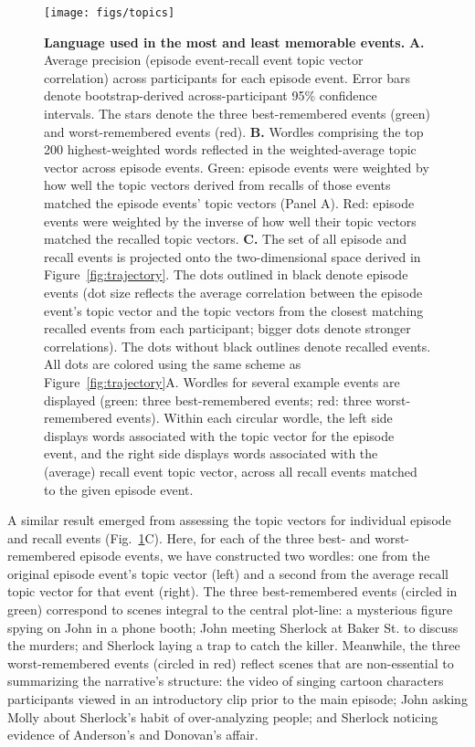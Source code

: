 \documentclass{article}
\begin{document}
\begin{figure}[tp]
\centering
\texttt{[image: figs/topics]}
\caption{\small \textbf{Language used in the most and least memorable events.} \textbf{A.} Average precision (episode event-recall event topic vector correlation) across participants for each episode event.  Error bars denote bootstrap-derived across-participant 95\% confidence intervals.  The stars denote the three best-remembered events (green) and worst-remembered events (red).  \textbf{B.} Wordles comprising the top 200 highest-weighted words reflected in the weighted-average topic vector across episode events.  Green: episode events were weighted by how well the topic vectors derived from recalls of those events matched the episode events' topic vectors (Panel A).  Red: episode events were weighted by the inverse of how well their topic vectors matched the recalled topic vectors.  \textbf{C.}  The set of all episode and recall events is projected onto the two-dimensional space derived in Figure~\ref{fig:trajectory}.  The dots outlined in black denote episode events (dot size reflects the average correlation between the episode event's topic vector and the topic vectors from the closest matching recalled events from each participant; bigger dots denote stronger correlations).  The dots without black outlines denote recalled events.  All dots are colored using the same scheme as Figure~\ref{fig:trajectory}A.  Wordles for several example events are displayed (green: three best-remembered events; red: three worst-remembered events).  Within each circular wordle, the left side displays words associated with the topic vector for the episode event, and the right side displays words associated with the (average) recall event topic vector, across all recall events matched to the given episode event.}
\label{fig:topics}
\end{figure}

A similar result emerged from assessing the topic vectors for individual episode and recall events (Fig.~\ref{fig:topics}C).  Here, for each of the three best- and worst-remembered episode events, we have constructed two wordles: one from the original episode event's topic vector (left) and a second from the average recall topic vector for that event (right).  The three best-remembered events (circled in green) correspond to scenes integral to the central plot-line: a mysterious figure spying on John in a phone booth; John meeting Sherlock at Baker St. to discuss the murders; and Sherlock laying a trap to catch the killer.  Meanwhile, the three worst-remembered events (circled in red) reflect scenes that are non-essential to summarizing the narrative's structure: the video of singing cartoon characters participants viewed in an introductory clip prior to the main episode; John asking Molly about Sherlock's habit of over-analyzing people; and Sherlock noticing evidence of Anderson's and Donovan's affair.
\end{document}

